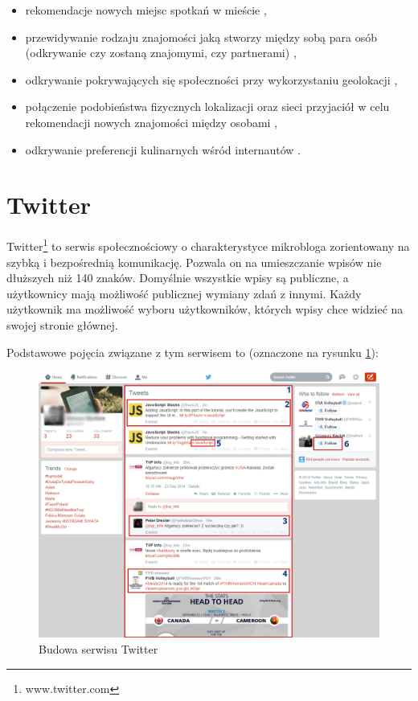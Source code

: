 \begin{itemize}
  \item rekomendacje nowych miejsc spotkań w mieście 
  \cite{ARandomWalkAroundTheCity},
  
  \item przewidywanie rodzaju znajomości jaką stworzy między sobą para osób
  (odkrywanie czy zostaną znajomymi, czy partnerami)
  \cite{AcquaintanceOrPartnerPredictingPartnership},
  
  \item odkrywanie pokrywających się społeczności przy wykorzystaniu geolokacji
  \cite{DiscoveringAndProfilingOverlappingCommunities},
  
  \item połączenie podobieństwa fizycznych lokalizacji oraz sieci przyjaciół w
  celu rekomendacji nowych znajomości między osobami 
  \cite{RecommendingFriendsInstantly},
  
  \item odkrywanie preferencji kulinarnych wśród internautów 
  \cite{WhatCuisineDoYouLike}.
\end{itemize}



\section{Twitter}
Twitter\footnote{www.twitter.com} to serwis społecznościowy o charakterystyce mikrobloga zorientowany
na szybką i bezpośrednią komunikację. Pozwala on
na umieszczanie wpisów nie dłuższych niż 140 znaków. Domyślnie wszystkie 
wpisy są publiczne, a użytkownicy mają możliwość publicznej wymiany zdań
z innymi. Każdy użytkownik ma możliwość wyboru użytkowników, których
wpisy chce widzieć na swojej stronie głównej.

Podstawowe pojęcia związane z tym serwisem to (oznaczone na rysunku \ref{image:twitter-screen}):

\begin{figure}[ht!]
\centering
\includegraphics[width=160mm]{img/twitter-screen2.png}
\caption{Budowa serwisu Twitter}
\label{image:twitter-screen}
\end{figure}

